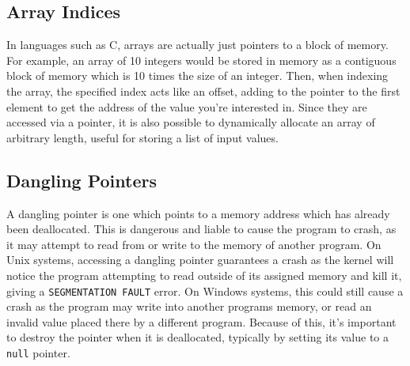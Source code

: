 \subsection*{Array Indices}

In languages such as C, arrays are actually just pointers to a block of memory. For example, an array of 10 integers
 would be stored in memory as a contiguous block of memory which is 10 times the size of an integer. Then, when indexing
 the array, the specified index acts like an offset, adding to the pointer to the first element to get the address of
 the value you're interested in. Since they are accessed via a pointer, it is also possible to dynamically allocate an
 array of arbitrary length, useful for storing a list of input values.

\subsection*{Dangling Pointers}

A dangling pointer is one which points to a memory address which has already been deallocated. This is dangerous and liable
 to cause the program to crash, as it may attempt to read from or write to the memory of another program. On Unix systems,
 accessing a dangling pointer guarantees a crash as the kernel will notice the program attempting to read outside of
 its assigned memory and kill it, giving a \verb`SEGMENTATION FAULT` error. On Windows systems, this could still cause a
 crash as the program may write into another programs memory, or read an invalid value placed there by a different
 program. Because of this, it's important to destroy the pointer when it is deallocated, typically by setting its value
 to a \verb`null` pointer.